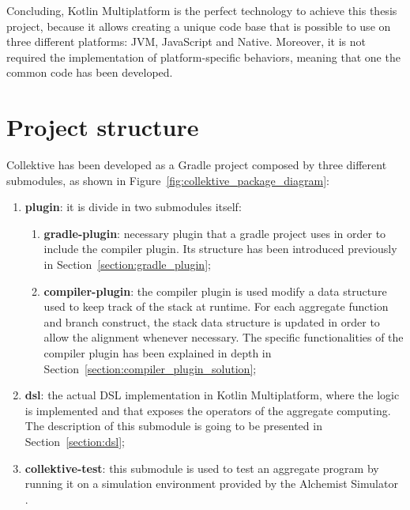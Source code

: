 Concluding, Kotlin Multiplatform is the perfect technology to achieve this thesis project, because it allows creating a unique code base that is possible to use on three different platforms: JVM, JavaScript and Native. Moreover, it is not required the implementation of platform-specific behaviors, meaning that one the common code has been developed.

\section{Project structure}\label{section:project_structure}
Collektive has been developed as a Gradle project composed by three different submodules, as shown in Figure~\ref{fig:collektive_package_diagram}:
\begin{enumerate}
    \item \textbf{plugin}: it is divide in two submodules itself: 
    \begin{enumerate}
        \item \textbf{gradle-plugin}: necessary plugin that a gradle project uses in order to include the compiler plugin. Its structure has been introduced previously in Section~\ref{section:gradle_plugin};
        \item \textbf{compiler-plugin}: the compiler plugin is used modify a data structure used to keep track of the stack at runtime. For each aggregate function and branch construct, the stack data structure is updated in order to allow the alignment whenever necessary. The specific functionalities of the compiler plugin has been explained in depth in Section~\ref{section:compiler_plugin_solution}; 
    \end{enumerate}
    \item \textbf{dsl}: the actual DSL implementation in Kotlin Multiplatform, where the logic is implemented and that exposes the operators of the aggregate computing. The description of this submodule is going to be presented in Section~\ref{section:dsl};
    \item \textbf{collektive-test}: this submodule is used to test an aggregate program by running it on a simulation environment provided by the Alchemist Simulator \cite{alchemist}.
\end{enumerate}

